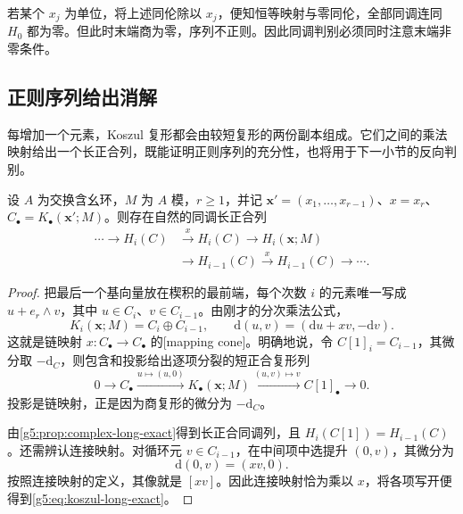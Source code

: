 若某个 \(x_j\) 为单位，将上述同伦除以 \(x_j\)，便知恒等映射与零同伦，全部同调连同 \(H_0\) 都为零。但此时末端商为零，序列不正则。因此同调判别必须同时注意末端非零条件。

\subsection{正则序列给出消解}
\label{g5:subsec:0802:03}

每增加一个元素，Koszul 复形都会由较短复形的两份副本组成。它们之间的乘法映射给出一个长正合列，既能证明正则序列的充分性，也将用于下一小节的反向判别。

\begin{lemma}\label{g5:lem:koszul-mapping-cone}
	设 \(A\) 为交换含幺环，\(M\) 为 \(A\) 模，\(r\geq1\)，并记
	\(\mathbf x'=(x_1,\ldots,x_{r-1})\)、\(x=x_r\)、\(C_\bullet=K_\bullet(\mathbf x';M)\)。则存在自然的同调长正合列
	\begin{equation}\label{g5:eq:koszul-long-exact}
		\begin{aligned}
		\cdots\longrightarrow H_i(C)&\xrightarrow{x}H_i(C)
		\longrightarrow H_i(\mathbf x;M)\\
		&\longrightarrow H_{i-1}(C)\xrightarrow{x}H_{i-1}(C)
		\longrightarrow\cdots.
		\end{aligned}
	\end{equation}
\end{lemma}
\begin{proof}
	把最后一个基向量放在楔积的最前端，每个次数 \(i\) 的元素唯一写成 \(u+e_r\wedge v\)，其中 \(u\in C_i\)、\(v\in C_{i-1}\)。由刚才的分次乘法公式，
	\[
		K_i(\mathbf x;M)=C_i\oplus C_{i-1},
		\qquad
		\mathrm d(u,v)=(\mathrm d u+xv,-\mathrm d v).
	\]
	这就是链映射 \(x:C_\bullet\to C_\bullet\) 的[mapping cone]。明确地说，令 \(C[1]_i=C_{i-1}\)，其微分取 \(-\mathrm d_C\)，则包含和投影给出逐项分裂的短正合复形列
	\[
		0\longrightarrow C_\bullet
		\xrightarrow{u\mapsto(u,0)}K_\bullet(\mathbf x;M)
		\xrightarrow{(u,v)\mapsto v}C[1]_\bullet
		\longrightarrow0.
	\]
	投影是链映射，正是因为商复形的微分为 \(-\mathrm d_C\)。

	由\cref{g5:prop:complex-long-exact}得到长正合同调列，且 \(H_i(C[1])=H_{i-1}(C)\)。还需辨认连接映射。对循环元 \(v\in C_{i-1}\)，在中间项中选提升 \((0,v)\)，其微分为
	\[
		\mathrm d(0,v)=(xv,0).
	\]
	按照连接映射的定义，其像就是 \([xv]\)。因此连接映射恰为乘以 \(x\)，将各项写开便得到\eqref{g5:eq:koszul-long-exact}。
\end{proof}

